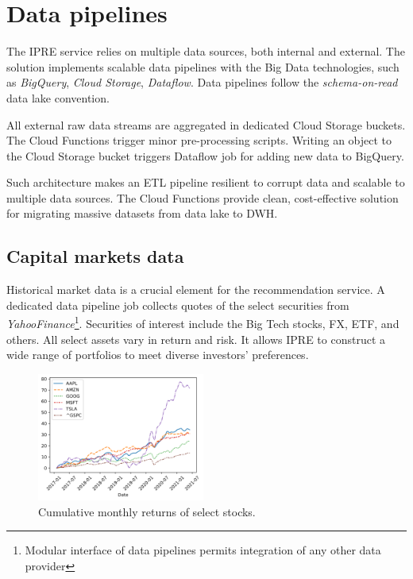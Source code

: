 \documentclass[twocolumn]{article}
\begin{document}
\section{Data pipelines}
    The IPRE service relies on multiple data sources, both internal and external.
    The solution implements scalable data pipelines with the Big Data technologies, such as \emph{BigQuery}, \emph{Cloud Storage}, \emph{Dataflow}.
    Data pipelines follow the \emph{schema-on-read} data lake convention.

    All external raw data streams are aggregated in dedicated Cloud Storage buckets.
    The Cloud Functions trigger minor pre-processing scripts.
    Writing an object to the Cloud Storage bucket triggers Dataflow job for adding new data to BigQuery.

    Such architecture makes an ETL pipeline resilient to corrupt data and scalable to multiple data sources.
    The Cloud Functions provide clean, cost-effective solution for migrating massive datasets from data lake to DWH.

\subsection{Capital markets data}
    Historical market data is a crucial element for the recommendation service.
    A dedicated data pipeline job collects quotes of the select securities from \emph{YahooFinance}\footnote{Modular interface of data pipelines permits integration of any other data provider}.
    Securities of interest include the Big Tech stocks, FX, ETF, and others.
    All select assets vary in return and risk.
    It allows IPRE to construct a wide range of portfolios to meet diverse investors' preferences.

    \begin{figure}
        \includegraphics[width=0.49\textwidth]{media/returns-lineplot.png}
        \caption{Cumulative monthly returns of select stocks.}
    \end{figure}
\end{document}
